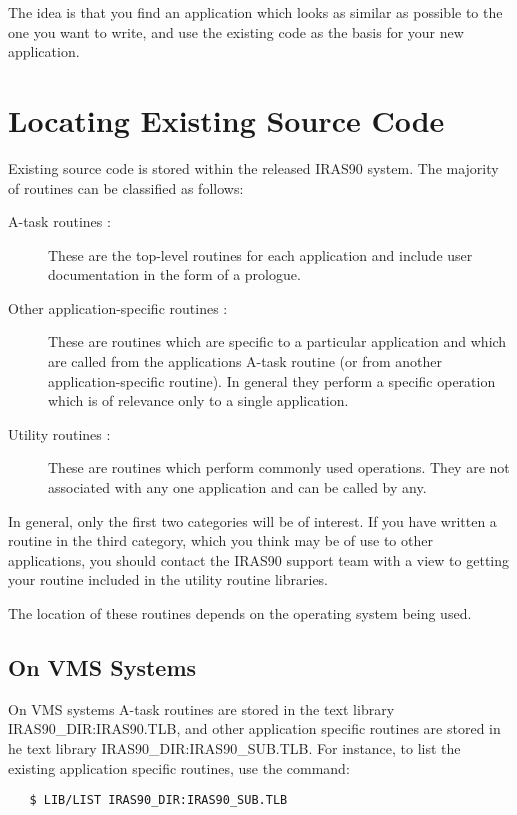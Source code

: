 The idea is that you find an application which looks as similar as possible to 
the one you want to write, and use the existing code as the basis for your new
application.

\section{Locating Existing Source Code}
Existing source code is stored within the released {\small IRAS90} system. 
The majority of routines can be classified as follows:

\begin{description}
\item [A-task routines :] These are the top-level routines for each application 
and include user documentation in the form of a prologue.
\item [Other application-specific routines :] These are routines which are 
specific to a particular application and which are called from the applications
A-task routine (or from another application-specific routine). In general they 
perform a specific operation which is of relevance only to a single application.
\item [Utility routines :] These are routines which perform commonly used
operations. They are not associated with any one application and can be
called by any. 
\end{description}

In general, only the first two categories will be of interest. If you have
written a routine in the third category, which you think may be of use to other
applications, you should contact the {\small IRAS90} support team with a view to
getting your routine included in the utility routine libraries. 

The location of these routines depends on the operating system being used.

\subsection{On VMS Systems}
On {\small VMS} systems A-task routines are stored in the text library {\small 
IRAS90\_DIR:IRAS90.TLB}, and other application specific routines are stored in 
he text library {\small IRAS90\_DIR:IRAS90\_SUB.TLB}. For instance, to list the 
existing application specific routines, use the command:

\small
\begin{verbatim}
   $ LIB/LIST IRAS90_DIR:IRAS90_SUB.TLB
\end{verbatim}
\normalsize

